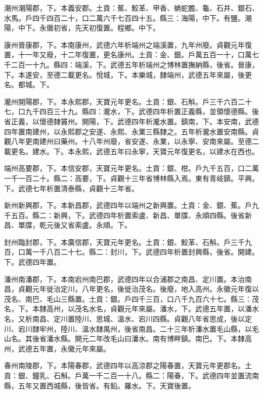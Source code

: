 \begin{pinyinscope}
 潮州潮陽郡，下。本義安郡。土貢：蕉、鮫革、甲香、蚺蛇膽、龜、石井、銀石、水馬。戶四千四百二十，口二萬六千七百四十五。縣三：海陽，中下。有鹽。潮陽，中下。永徽初省，先天初復置。程鄉。中下。



 康州晉康郡，下。本南康州，武德六年析端州之端溪置，九年州廢。貞觀元年復置，十一年又廢，十二年復置，更名康州。土貢：金、銀。戶萬五百一十，口萬七千二百一十九。縣四：端溪，下。武德五年析端州之博林置撫納縣，後省。晉康，下。本遂安，至德二載更名。悅城，下。本樂城，隸端州，武德五年來屬，後更名。都城。下。



 瀧州開陽郡，下。本永熙郡，天寶元年更名。土貢：銀、石斛。戶三千六百二十七，口九千四百三十九。縣四：瀧水，下。武德四年析置正義縣，並領懷德縣。後省正義，以懷德隸竇州。開陽，下。武德四年析瀧水置。鎮南，下。本安南，武德四年置南建州，以永熙郡之安遂、永熙、永業三縣隸之。五年析瀧水置安南縣。貞觀八年更南建州曰藥州。十八年州廢，省安遂、永業，以永寧、安南來屬。至德二載更名。建水。下。本永熙，武德五年曰永寧，天寶元年復更名，以建水在西也。



 端州高要郡，下。本信安郡，天寶元年更名。土貢：銀、柑。戶九千五百，口二萬一千一百二十。縣二：高要，下。貞觀十三年省博林縣入焉。東有青岐鎮。平興。下。武德七年析置清泰縣，貞觀十三年省。



 新州新興郡，下。本新昌郡，武德四年以端州之新興置。土貢：金、銀、蕉。戶九千五百。縣二：新興，下。武德四年析置索盧、新昌、單牒、永順四縣。後省新昌、單牒，乾元後又省索盧。永順。下。



 封州臨封郡，下。本廣信郡，天寶元年更名。土貢：銀、鮫革、石斛。戶三千九百，口萬一千八百二十七。縣二：封川，下。武德四年析置封興縣，後省。開建。下。武德四年置。



 潘州南潘郡，下。本南宕州南巴郡，武德四年以合浦郡之南昌、定川置。本治南昌，貞觀元年徙治定川，八年更名，後徙治茂名。後廢，地入高州。永徽元年復以茂名、南巴、毛山三縣置。土貢：銀。戶四千三百，口八千九百六十七。縣三：茂名，下。本隸高州，以茂名水名，貞觀元年來屬。潘水，下。武德五年置，以潘水名，又析南昌、定川置陸川、思城、溫水、宕川四縣。貞觀八年省思成，後以定川、宕川隸牢州，陸川、溫水隸禺州，後省南昌。二十三年析潘水置毛山縣，以毛山名。其後省潘水縣。開元二年改毛山曰潘水。南有博畔鎮。南巴。下。本隸高州，武德五年置，永徽元年來屬。



 春州南陵郡，下。本陽春郡，武德四年以高涼郡之陽春置，天寶元年更郡名。土貢：銀、鐘乳、石斛。戶萬一千二百一十八。縣二：陽春，下。武德四年並置流南縣，五年又置西城縣，後皆省。有鉛。羅水。下。天寶後置。




\end{pinyinscope}
